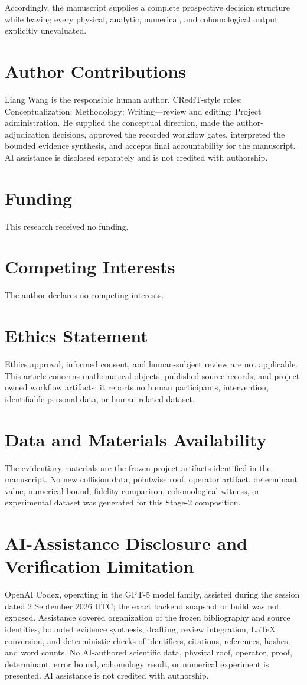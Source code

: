 \documentclass[11pt,a4paper]{article}
\begin{document}
Accordingly, the manuscript supplies a complete prospective decision structure while leaving every physical, analytic, numerical, and cohomological output explicitly unevaluated.

\section*{Author Contributions}
Liang Wang is the responsible human author. CRediT-style roles: Conceptualization; Methodology; Writing---review and editing; Project administration. He supplied the conceptual direction, made the author-adjudication decisions, approved the recorded workflow gates, interpreted the bounded evidence synthesis, and accepts final accountability for the manuscript. AI assistance is disclosed separately and is not credited with authorship.

\section*{Funding}
This research received no funding.

\section*{Competing Interests}
The author declares no competing interests.

\section*{Ethics Statement}
Ethics approval, informed consent, and human-subject review are not applicable. This article concerns mathematical objects, published-source records, and project-owned workflow artifacts; it reports no human participants, intervention, identifiable personal data, or human-related dataset.

\section*{Data and Materials Availability}
The evidentiary materials are the frozen project artifacts identified in the manuscript. No new collision data, pointwise roof, operator artifact, determinant value, numerical bound, fidelity comparison, cohomological witness, or experimental dataset was generated for this Stage-2 composition.

\section*{AI-Assistance Disclosure and Verification Limitation}
OpenAI Codex, operating in the GPT-5 model family, assisted during the session dated 2 September 2026 UTC; the exact backend snapshot or build was not exposed. Assistance covered organization of the frozen bibliography and source identities, bounded evidence synthesis, drafting, review integration, LaTeX conversion, and deterministic checks of identifiers, citations, references, hashes, and word counts. No AI-authored scientific data, physical roof, operator, proof, determinant, error bound, cohomology result, or numerical experiment is presented. AI assistance is not credited with authorship.
\end{document}
